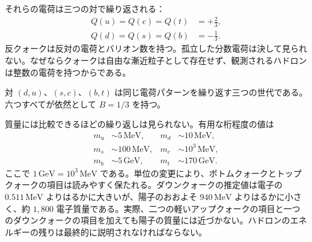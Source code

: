 \begin{classroomqa}
\end{classroomqa}

それらの電荷は三つの対で繰り返される：
\begin{equation}
\begin{aligned}
Q(u)=Q(c)=Q(t)&=+\frac23,
\\
Q(d)=Q(s)=Q(b)&=-\frac13.
\end{aligned}
\end{equation}
反クォークは反対の電荷とバリオン数を持つ。孤立した分数電荷は決して見られない。なぜならクォークは自由な漸近粒子として存在せず、観測されるハドロンは整数の電荷を持つからである。

対 \((d,u)\)、\((s,c)\)、\((b,t)\) は同じ電荷パターンを繰り返す三つの世代である。六つすべてが依然として \(B=1/3\) を持つ。

\begin{classroomqa}
\end{classroomqa}

質量には比較できるほどの繰り返しは見られない。有用な桁程度の値は
\begin{align}
m_u &\sim 5\,\mathrm{MeV},
&
m_d &\sim 10\,\mathrm{MeV},
\\
m_s &\sim 100\,\mathrm{MeV},
&
m_c &\sim 10^3\,\mathrm{MeV},
\\
m_b &\sim 5\,\mathrm{GeV},
&
m_t &\sim 170\,\mathrm{GeV}.
\end{align}
ここで \(1\,\mathrm{GeV}=10^3\,\mathrm{MeV}\) である。単位の変更により、ボトムクォークとトップクォークの項目は読みやすく保たれる。ダウンクォークの推定値は電子の \(0.511\,\mathrm{MeV}\) よりはるかに大きいが、陽子のおおよそ \(940\,\mathrm{MeV}\) よりはるかに小さく、約 \(1{,}800\) 電子質量である。実際、二つの軽いアップクォークの項目と一つのダウンクォークの項目を加えても陽子の質量には近づかない。ハドロンのエネルギーの残りは最終的に説明されなければならない。


